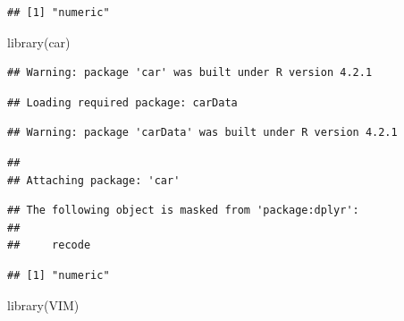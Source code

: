 \documentclass[
]{article}
\newenvironment{Shaded}{\begin{snugshade}}{\end{snugshade}}
\newcommand{\AttributeTok}[1]{\textcolor[rgb]{0.77,0.63,0.00}{#1}}
\newcommand{\FunctionTok}[1]{\textcolor[rgb]{0.00,0.00,0.00}{#1}}
\newcommand{\NormalTok}[1]{#1}
\newcommand{\OtherTok}[1]{\textcolor[rgb]{0.56,0.35,0.01}{#1}}
\newcommand{\SpecialCharTok}[1]{\textcolor[rgb]{0.00,0.00,0.00}{#1}}
\newcommand{\StringTok}[1]{\textcolor[rgb]{0.31,0.60,0.02}{#1}}
\begin{document}
\begin{verbatim}
## [1] "numeric"
\end{verbatim}

\begin{Shaded}
\begin{Highlighting}[]
\FunctionTok{library}\NormalTok{(car)}
\end{Highlighting}
\end{Shaded}

\begin{verbatim}
## Warning: package 'car' was built under R version 4.2.1
\end{verbatim}

\begin{verbatim}
## Loading required package: carData
\end{verbatim}

\begin{verbatim}
## Warning: package 'carData' was built under R version 4.2.1
\end{verbatim}

\begin{verbatim}
## 
## Attaching package: 'car'
\end{verbatim}

\begin{verbatim}
## The following object is masked from 'package:dplyr':
## 
##     recode
\end{verbatim}

\begin{Shaded}
\end{Shaded}

\begin{Shaded}
\end{Shaded}

\begin{verbatim}
## [1] "numeric"
\end{verbatim}

\begin{Shaded}
\begin{Highlighting}[]
\FunctionTok{library}\NormalTok{(VIM)}
\end{Highlighting}
\end{Shaded}
\end{document}
